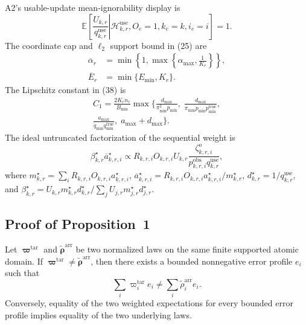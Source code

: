 A2's usable-update mean-ignorability display is
\begin{equation}
 \mathbb{E}\!\left[
 \left.
 \frac{U_{k,r}}{q^{\mathrm{use}}_{k,r}}
 \right|
 \mathcal{H}^{\mathrm{use}}_{k,r},
 O_e=1,k_e=k,i_e=i
 \right]
 =1.
 \label{eq:A2_use_mean_ignorability}
\end{equation}
The coordinate cap and $\ell_2$ support bound in (25) are
\begin{equation}
\begin{aligned}
 \overline\alpha_r
 &=
 \min\!\left\{
 1,
 \max\!\left\{
 \alpha_{\max},
 \frac{1}{K_r}
 \right\}
 \right\},\\
 \overline E_r
 &=
 \min\{E_{\min},K_r\}.
\end{aligned}
 \label{eq:cap_ess}
\end{equation}
The Lipschitz constant in (38) is
\begin{multline}
C_1
=
\frac{2K_r n_r}{B_{\min}}
\max\Biggl\{
\frac{d_{\max}}{\pi_{\min}^2 p_{\min}},\;
\frac{d_{\max}}{\pi_{\min}p_{\min}p_{\min}^{\mathrm{true}}},\\
\frac{a_{\max}}{q_{\min}q_{\min}^{\mathrm{true}}},\;
a_{\max}+d_{\max}
\Biggr\}.
\label{eq:g4_c1}
\end{multline}
The ideal untruncated factorization of the sequential weight is
\begin{equation}
 \beta^\star_{k,r}\overline a^\star_{k,r,i}
 \propto
 R_{k,r,i}O_{k,r,i}U_{k,r}
 \frac{\zeta^{o}_{k,r,i}}
 {p^{\mathrm{obs}}_{k,r,i}q^{\mathrm{use}}_{k,r}},
 \label{eq:factorized_global_weight}
\end{equation}
where
$m^\star_{k,r}=\sum_i R_{k,r,i}O_{k,r,i}a^\star_{k,r,i}$,
$\overline a^\star_{k,r,i}=R_{k,r,i}O_{k,r,i}a^\star_{k,r,i}/m^\star_{k,r}$,
$d^\star_{k,r}=1/q^{\mathrm{use}}_{k,r}$, and
$\beta^\star_{k,r}=U_{k,r}m^\star_{k,r}d^\star_{k,r}/
\sum_j U_{j,r}m^\star_{j,r}d^\star_{j,r}$.

\subsection{Proof of Proposition~1}
\label{app:proof_prop1}

\begin{proposition*}
Let $\boldsymbol\varpi^{\mathrm{tar}}$ and
$\widetilde{\boldsymbol\rho}^{\mathrm{arr}}$ be two normalized laws on the same
finite supported atomic domain.  If
$\boldsymbol\varpi^{\mathrm{tar}}\neq
\widetilde{\boldsymbol\rho}^{\mathrm{arr}}$, then there exists a bounded
nonnegative error profile $e_i$ such that
\begin{equation}
    \sum_i \varpi_i^{\mathrm{tar}}e_i
    \neq
    \sum_i \widetilde\rho_i^{\mathrm{arr}}e_i.
    \label{eq:app_prop1_claim}
\end{equation}
Conversely, equality of the two weighted expectations for every bounded error
profile implies equality of the two underlying laws.
\end{proposition*}

